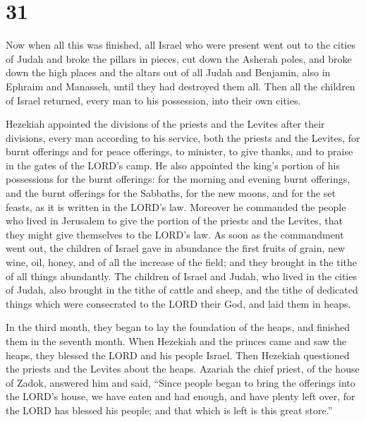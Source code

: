 \hypertarget{section-30}{%
\section{31}\label{section-30}}

 Now when all this was finished, all Israel who were present
went out to the cities of Judah and broke the pillars in pieces, cut
down the Asherah poles, and broke down the high places and the altars
out of all Judah and Benjamin, also in Ephraim and Manasseh, until they
had destroyed them all. Then all the children of Israel returned, every
man to his possession, into their own cities.

 Hezekiah appointed the divisions of the priests and the
Levites after their divisions, every man according to his service, both
the priests and the Levites, for burnt offerings and for peace
offerings, to minister, to give thanks, and to praise in the gates of
the LORD's camp.  He also appointed the king's portion of
his possessions for the burnt offerings: for the morning and evening
burnt offerings, and the burnt offerings for the Sabbaths, for the new
moons, and for the set feasts, as it is written in the LORD's law.
 Moreover he commanded the people who lived in Jerusalem to
give the portion of the priests and the Levites, that they might give
themselves to the LORD's law.  As soon as the commandment
went out, the children of Israel gave in abundance the first fruits of
grain, new wine, oil, honey, and of all the increase of the field; and
they brought in the tithe of all things abundantly.  The
children of Israel and Judah, who lived in the cities of Judah, also
brought in the tithe of cattle and sheep, and the tithe of dedicated
things which were consecrated to the LORD their God, and laid them in
heaps.

 In the third month, they began to lay the foundation of the
heaps, and finished them in the seventh month.  When
Hezekiah and the princes came and saw the heaps, they blessed the LORD
and his people Israel.  Then Hezekiah questioned the priests
and the Levites about the heaps.  Azariah the chief priest,
of the house of Zadok, answered him and said, ``Since people began to
bring the offerings into the LORD's house, we have eaten and had enough,
and have plenty left over, for the LORD has blessed his people; and that
which is left is this great store.''

